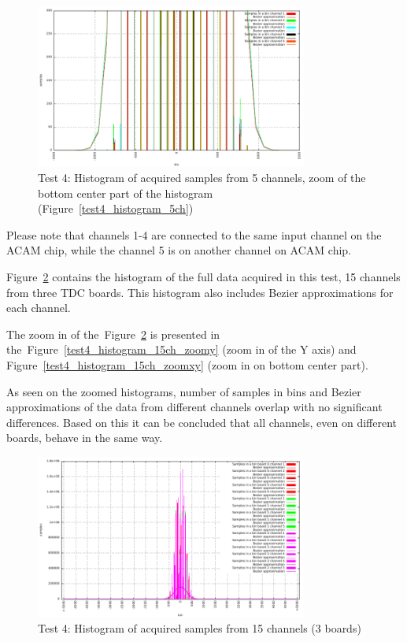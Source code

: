 \documentclass[a4paper, 12pt]{article}
\begin{document}
\begin{figure}[ht!]
  \centering
  \includegraphics[width=0.80\textwidth]{img/test4_histogram_5ch_zoomxy.pdf}
  \caption{Test 4: Histogram of acquired samples from 5 channels, zoom
	   of the bottom center part of the histogram
	   (Figure~\ref{test4_histogram_5ch})}
  \label{test4_histogram_5ch_zoomxy}
\end{figure}

Please note that channels 1-4 are connected to the same input channel on
the ACAM chip, while the channel 5 is on another channel on ACAM chip.

\FloatBarrier

Figure~\ref{test4_histogram_15ch} contains the histogram of the full data
acquired in this test, 15 channels from three TDC boards.
This histogram also includes Bezier approximations for each channel.

The zoom in of the~Figure~\ref{test4_histogram_15ch} is presented in
the~Figure~\ref{test4_histogram_15ch_zoomy} (zoom in of the Y axis) and
Figure~\ref{test4_histogram_15ch_zoomxy} (zoom in on bottom center part).

As seen on the zoomed histograms, number of samples in bins and Bezier
approximations of the data from different channels overlap with no significant
differences. Based on this it can be concluded that all channels,
even on different boards, behave in the same way.


\begin{figure}[ht!]
  \centering
  \includegraphics[width=0.80\textwidth]{img/test4_histogram_15ch.pdf}
  \caption{Test 4: Histogram of acquired samples from 15 channels (3 boards)}
  \label{test4_histogram_15ch}
\end{figure}
\end{document}
